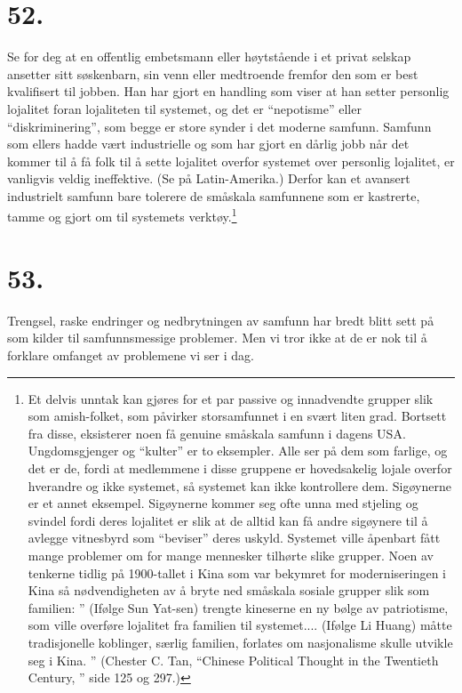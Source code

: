 \documentclass[oneside]{book}
\begin{document}
\section*{52.}
Se for deg at en offentlig embetsmann eller høytstående i et privat selskap
ansetter sitt søskenbarn, sin venn eller medtroende fremfor den som er best
kvalifisert til jobben. Han har gjort en handling som viser at han setter
personlig lojalitet foran lojaliteten til systemet, og det er ``nepotisme''
eller ``diskriminering'', som begge er store synder i det moderne samfunn.
Samfunn som ellers hadde vært industrielle og som har gjort en dårlig jobb når
det kommer til å få folk til å sette lojalitet overfor systemet over personlig
lojalitet, er vanligvis veldig ineffektive. (Se på Latin-Amerika.) Derfor kan
et avansert industrielt samfunn bare tolerere de småskala samfunnene som er
kastrerte, tamme og gjort om til systemets verktøy.\footnote{Et delvis unntak
kan gjøres for et par passive og innadvendte grupper slik som amish-folket, som
påvirker storsamfunnet i en svært liten grad. Bortsett fra disse, eksisterer
noen få genuine småskala samfunn i dagens USA. Ungdomsgjenger og ``kulter'' er
to eksempler. Alle ser på dem som farlige, og det er de, fordi at medlemmene i
disse gruppene er hovedsakelig lojale overfor hverandre og ikke systemet, så
systemet kan ikke kontrollere dem. Sigøynerne er et annet eksempel. Sigøynerne
kommer seg ofte unna med stjeling og svindel fordi deres lojalitet er slik at
de alltid kan få andre sigøynere til å avlegge vitnesbyrd som ``beviser'' deres
uskyld. Systemet ville åpenbart fått mange problemer om for mange mennesker
tilhørte slike grupper. Noen av tenkerne tidlig på 1900-tallet i Kina som var
bekymret for moderniseringen i Kina så nødvendigheten av å bryte ned småskala
sosiale grupper slik som familien: '' (Ifølge Sun Yat-sen) trengte kineserne en
ny bølge av patriotisme, som ville overføre lojalitet fra familien til
systemet.... (Ifølge Li Huang) måtte tradisjonelle koblinger, særlig familien,
forlates om nasjonalisme skulle utvikle seg i Kina. '' (Chester C. Tan,
``Chinese Political Thought in the Twentieth Century, '' side 125 og 297.)}

\section*{53.}
Trengsel, raske endringer og nedbrytningen av samfunn har bredt blitt sett på
som kilder til samfunnsmessige problemer. Men vi tror ikke at de er nok til å
forklare omfanget av problemene vi ser i dag. 
\end{document}
